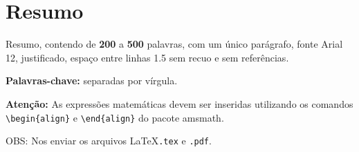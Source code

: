 \documentclass{sm}
\begin{document}
	\mostratitulo
	\mostradados															%
	
	\section{Resumo}
	
	Resumo, contendo de \textbf{200} a \textbf{500} palavras, com um único parágrafo, fonte Arial 12, justificado, espaço entre linhas 1.5 sem recuo e sem referências.
	
	\textbf{Palavras-chave:} separadas por vírgula.

	\vspace{\baselineskip}

	\textbf{Atenção:} As expressões matemáticas devem ser inseridas utilizando os comandos\\ \verb!\begin{align}! e \verb!\end{align}! do pacote amsmath.

	\vspace{\baselineskip}

	OBS: Nos enviar os arquivos \LaTeX \texttt{.tex} e \texttt{.pdf}.
	
\end{document}
